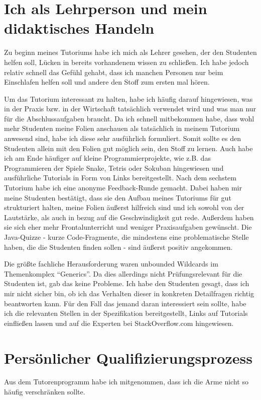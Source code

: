 \documentclass[a4paper,12pt]{article}
\begin{document}
\section*{Ich als Lehrperson und mein didaktisches Handeln}
Zu beginn meines Tutoriums habe ich mich als Lehrer gesehen, der
den Studenten helfen soll, Lücken in bereits vorhandenem wissen zu 
schließen. Ich habe jedoch relativ schnell das Gefühl gehabt, dass 
ich manchen Personen nur beim Einschlafen helfen soll und andere den
Stoff zum ersten mal hören. 

Um das Tutorium interessant zu halten, habe ich häufig darauf 
hingewiesen, was in der Praxis bzw. in der Wirtschaft tatsächlich
verwendet wird und was man nur für die Abschlussaufgaben braucht.
Da ich schnell mitbekommen habe, dass wohl mehr Studenten meine
Folien anschauen als tatsächlich in meinem Tutorium anwesend sind,
habe ich diese sehr ausführlich formuliert. Somit sollte es den
Studenten allein mit den Folien gut möglich sein, den Stoff zu lernen.
Auch habe ich am Ende häufiger auf kleine Programmierprojekte, wie
z.B. das Programmieren der Spiele Snake, Tetris oder Sokuban hingewiesen
und ausführliche Tutorials in Form von Links bereitgestellt.
Nach dem sechstem Tutorium habe ich eine anonyme Feedback-Runde gemacht.
Dabei haben mir meine Studenten bestätigt, dass sie den Aufbau meines
Tutoriums für gut strukturiert halten, meine Folien äußerst hilfreich
sind und ich sowohl von der Lautstärke, als auch in bezug auf die 
Geschwindigkeit gut rede. Außerdem haben sie sich eher mehr 
Frontalunterricht und weniger Praxisaufgaben gewünscht. Die 
Java-Quizze - kurze Code-Fragmente, die mindestens eine problematische
Stelle haben, die die Studenten finden sollen - sind äußerst positiv
angekommen.

Die größte fachliche Herausforderung waren unbounded Wildcards im
Themenkomplex "`Generics"'. Da dies allerdings nicht Prüfungsrelevant
für die Studenten ist, gab das keine Probleme. Ich habe den 
Studenten gesagt, dass ich mir nicht sicher bin, ob ich das Verhalten
dieser in konkreten Detailfragen richtig beantworten kann. Für den
Fall das jemand daran interessiert sein sollte, habe ich die 
relevanten Stellen in der Spezifikation bereitgestellt, Links auf
Tutorials einfließen lassen und auf die Experten bei StackOverflow.com
hingewiesen.

\section*{Persönlicher Qualifizierungsprozess}
Aus dem Tutorenprogramm habe ich mitgenommen, dass ich die Arme nicht
so häufig verschränken sollte.
\end{document}
